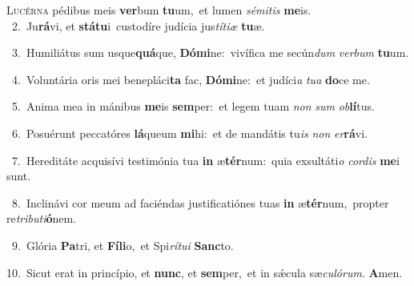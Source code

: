 \lettrine{\initial\textcolor{\initialcolor}{L}}{ucérna} pédibus meis \textbf{ver}\-bum \textbf{tu}\-um,~\star et lumen \textit{sé}\-\textit{mi}\textit{tis} \textbf{me}\-is.\\
{\numbfont\textcolor{\numbcolor}{~2.}}~Ju\-\textbf{rá}\-vi, et \textbf{stá}\-\textbf{tu}i~\star custodíre judícia jus\-\textit{tí}\-\textit{ti}\textit{æ} \textbf{tu}\-æ.\par
{\numbfont\textcolor{\numbcolor}{~3.}}~Humiliátus sum usque\-\textbf{quá}\-que, \textbf{Dó}\-\textbf{mi}ne:~\star vivífica me secún\textit{dum} \textit{ver}\-\textit{bum} \textbf{tu}\-um.\par
{\numbfont\textcolor{\numbcolor}{~4.}}~Voluntária oris mei benepláci\textbf{ta} fac, \textbf{Dó}\-\textbf{mi}ne:~\star et judíci\textit{a} \textit{tu}\-\textit{a} \textbf{do}\-ce me.\par
{\numbfont\textcolor{\numbcolor}{~5.}}~Anima mea in mánibus \textbf{me}\-is \textbf{sem}\-per:~\star et legem tuam \textit{non} \textit{sum} \textit{ob}\-\textbf{lí}tus.\par
{\numbfont\textcolor{\numbcolor}{~6.}}~Posuérunt peccatóres \textbf{lá}\-queum \textbf{mi}\-hi:~\star et de mandátis tu\textit{is} \textit{non} \textit{er}\-\textbf{rá}vi.\par
{\numbfont\textcolor{\numbcolor}{~7.}}~Hereditáte acquisívi testimónia tua \textbf{in} æ\-\textbf{tér}\-num:~\star quia exsultáti\textit{o} \textit{cor}\-\textit{dis} \textbf{me}\-i sunt.\par
{\numbfont\textcolor{\numbcolor}{~8.}}~Inclinávi cor meum ad faciéndas justificatiónes tuas \textbf{in} æ\-\textbf{tér}\-num,~\star propter re\-\textit{tri}\-\textit{bu}\textit{ti}\textbf{ó}nem.\par
{\numbfont\textcolor{\numbcolor}{~9.}}~Glória \textbf{Pa}\-tri, et \textbf{Fí}\-\textbf{li}o,~\star et Spi\-\textit{rí}\-\textit{tu}\textit{i} \textbf{Sanc}\-to.\par
{\numbfont\textcolor{\numbcolor}{10.}}~Sicut erat in princípio, et \textbf{nunc}\-, et \textbf{sem}\-per,~\star et in sǽcula sæ\-\textit{cu}\-\textit{ló}\textit{rum}. \textbf{A}\-men.\par
